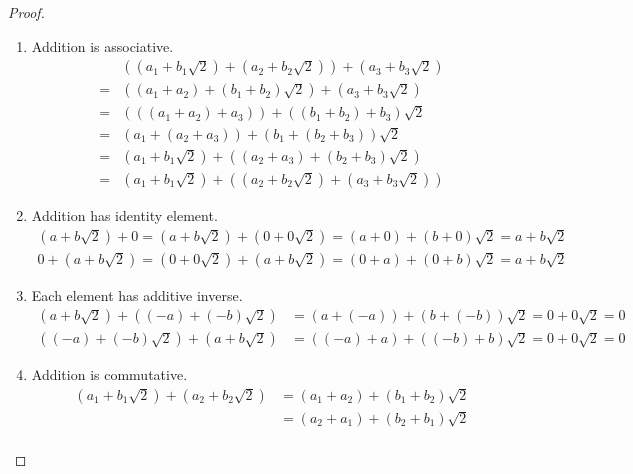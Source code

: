 \begin{proof}
    \begin{enumerate}[label = (\arabic*)]
        \item Addition is associative.
              \begin{align*}
                    & \left((a_{1} + b_{1}\sqrt{2}) + (a_{2} + b_{2}\sqrt{2})\right) + (a_{3} + b_{3}\sqrt{2})                    \\
                  = & \left((a_{1} + a_{2}) + (b_{1} + b_{2})\sqrt{2}\right) + (a_{3} + b_{3}\sqrt{2})                            \\
                  = & \left(\left((a_{1} + a_{2}) + a_{3}\right)\right) + \left(\left(b_{1} + b_{2}\right) + b_{3}\right)\sqrt{2} \\
                  = & \left(a_{1} + \left(a_{2} + a_{3}\right)\right) + \left(b_{1} + \left(b_{2} + b_{3}\right)\right)\sqrt{2}   \\
                  = & (a_{1} + b_{1}\sqrt{2}) + \left((a_{2} + a_{3}) + (b_{2} + b_{3})\sqrt{2}\right)                            \\
                  = & (a_{1} + b_{1}\sqrt{2}) + \left((a_{2} + b_{2}\sqrt{2}) + (a_{3} + b_{3}\sqrt{2})\right)
              \end{align*}
        \item Addition has identity element.
              \begin{align*}
                  (a + b\sqrt{2}) + 0 = (a + b\sqrt{2}) + (0 + 0\sqrt{2}) = (a + 0) + (b + 0)\sqrt{2} = a + b\sqrt{2} \\
                  0 + (a + b\sqrt{2}) = (0 + 0\sqrt{2}) + (a + b\sqrt{2}) = (0 + a) + (0 + b)\sqrt{2} = a + b\sqrt{2}
              \end{align*}
        \item Each element has additive inverse.
              \begin{align*}
                  (a + b\sqrt{2}) + ((-a) + (-b)\sqrt{2}) & = (a + (-a)) + (b + (-b))\sqrt{2} = 0 + 0\sqrt{2} = 0 \\
                  ((-a) + (-b)\sqrt{2}) + (a + b\sqrt{2}) & = ((-a) + a) + ((-b) + b)\sqrt{2} = 0 + 0\sqrt{2} = 0
              \end{align*}
        \item Addition is commutative.
              \begin{align*}
                  (a_{1} + b_{1}\sqrt{2}) + (a_{2} + b_{2}\sqrt{2}) & = (a_{1} + a_{2}) + (b_{1} + b_{2})\sqrt{2}         \\
                                                                    & = (a_{2} + a_{1}) + (b_{2} + b_{1})\sqrt{2}         \\

\end{align*}
\end{enumerate}
\end{proof}

